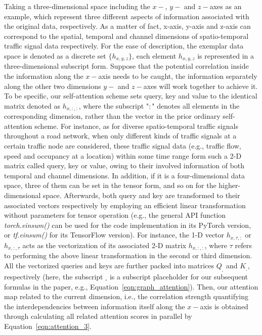 Taking a three-dimensional space including the $x-$, $y-$ and $z-$axes as an example, which represent three different aspects of information associated with the original data, respectively. As a matter of fact, x-axis, y-axis and z-axis can correspond to the spatial, temporal and channel dimensions of spatio-temporal traffic signal data respectively. For the ease of description, the exemplar data space is denoted as a discrete set $\{h_{x,y,z}\}$, each element  $h_{x,y,z}$ is represented in a three-dimensional subscript form. Suppose that the potential correlation inside the information along the $x-$axis needs to be caught, the information separately along the other two dimensions  $y-$ and $z-$axes will work together to achieve it. To be specific, our self-attention scheme sets query, key and value to the identical matrix denoted as $h_{x,:,:}$, where the subscript "$:$" denotes all elements in the corresponding dimension, rather than the vector in the prior ordinary self-attention scheme. For instance, as for diverse spatio-temporal traffic signals throughout a road network, when only different kinds of traffic signals at a certain traffic node are considered, these traffic signal data (e.g., traffic flow, speed and occupancy at a location) within some time range form such a 2-D matrix called query, key or value, owing to their involved information of both temporal and channel dimensions. In addition, if it is a four-dimensional data space, three of them can be set in the tensor form, and so on for the higher-dimensional space. Afterwards, both query and key are transformed to their associated vectors respectively by employing an efficient linear transformation without parameters for tensor operation (e.g., the general API function \textit{torch.einsum()} can be used for the code implementation in its PyTorch version, or \textit{tf.einsum()} for its TensorFlow version). For instance, the 1-D vector $h_{x,\tau,:}$ or $h_{x,:,\tau}$ acts as the vectorization of its associated 2-D matrix $h_{x,:,:}$, where $\tau$ refers to performing the above linear transformation in the second or third dimension. All the vectorized queries and keys are further packed into matrices $Q_{_\square}$ and $K_{_\square}$, respectively (here, the subscript ${_\square}$ is a subscript placeholder for our subsequent formulas in the paper, e.g., Equation~\ref{eqn:graph_attention}). Then, our attention map related to the current dimension, i.e., the correlation strength quantifying the interdependencies between information itself along the $x-$axis is obtained through calculating all related attention scores in parallel by Equation~\ref{eqn:attention_3}.

